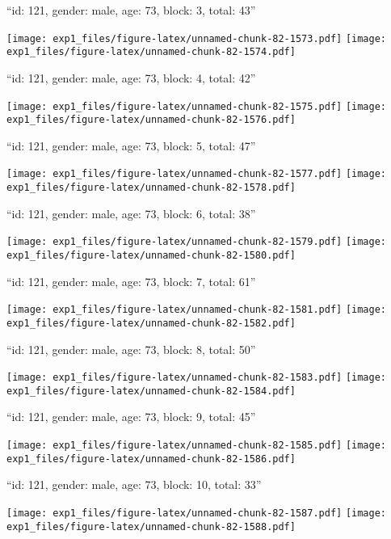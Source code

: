 \documentclass[11pt,,]{article}
\begin{document}
\newpage
[1] 

``id: 121, gender: male, age: 73, block: 3, total: 43''

\texttt{[image: exp1\_files/figure-latex/unnamed-chunk-82-1573.pdf]}
\texttt{[image: exp1\_files/figure-latex/unnamed-chunk-82-1574.pdf]}

\newpage
[1] 

``id: 121, gender: male, age: 73, block: 4, total: 42''

\texttt{[image: exp1\_files/figure-latex/unnamed-chunk-82-1575.pdf]}
\texttt{[image: exp1\_files/figure-latex/unnamed-chunk-82-1576.pdf]}

\newpage
[1] 

``id: 121, gender: male, age: 73, block: 5, total: 47''

\texttt{[image: exp1\_files/figure-latex/unnamed-chunk-82-1577.pdf]}
\texttt{[image: exp1\_files/figure-latex/unnamed-chunk-82-1578.pdf]}

\newpage
[1] 

``id: 121, gender: male, age: 73, block: 6, total: 38''

\texttt{[image: exp1\_files/figure-latex/unnamed-chunk-82-1579.pdf]}
\texttt{[image: exp1\_files/figure-latex/unnamed-chunk-82-1580.pdf]}

\newpage
[1] 

``id: 121, gender: male, age: 73, block: 7, total: 61''

\texttt{[image: exp1\_files/figure-latex/unnamed-chunk-82-1581.pdf]}
\texttt{[image: exp1\_files/figure-latex/unnamed-chunk-82-1582.pdf]}

\newpage
[1] 

``id: 121, gender: male, age: 73, block: 8, total: 50''

\texttt{[image: exp1\_files/figure-latex/unnamed-chunk-82-1583.pdf]}
\texttt{[image: exp1\_files/figure-latex/unnamed-chunk-82-1584.pdf]}

\newpage
[1] 

``id: 121, gender: male, age: 73, block: 9, total: 45''

\texttt{[image: exp1\_files/figure-latex/unnamed-chunk-82-1585.pdf]}
\texttt{[image: exp1\_files/figure-latex/unnamed-chunk-82-1586.pdf]}

\newpage
[1] 

``id: 121, gender: male, age: 73, block: 10, total: 33''

\texttt{[image: exp1\_files/figure-latex/unnamed-chunk-82-1587.pdf]}
\texttt{[image: exp1\_files/figure-latex/unnamed-chunk-82-1588.pdf]}
\end{document}
